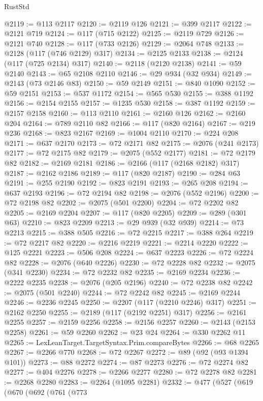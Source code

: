 \begin{lexlean}{RustStd}
\begin{coremodule}
@2119 := @113 @2117
@2120 := @2119 @126
@2121 := @399 @2117
@2122 := @2121 @719
@2124 := @117 (@715 @2122)
@2125 := @2119 @729
@2126 := @2121 @740
@2128 := @117 (@733 @2126)
@2129 := @2064 @748
@2133 := @2128 (@117 (@746 @2129) @317)
@2134 := @2125 @2133
@2138 := @2124 (@117 (@725 @2134) @317)
@2140 := @2118 (@2120 @2138)
@2141 := @59 @2140
@2143 := @65 @2108 @2110
@2146 := @29 @934 (@32 @934)
@2149 := @2143 (@73 @2146 @83)
@2150 := @59 @2149
@2151 := @840 @1090
@2152 := @59 @2151
@2153 := @537 @1172
@2154 := @565 @530
@2155 := @388 @1192
@2156 := @2154 @2155
@2157 := @1235 @530
@2158 := @387 @1192
@2159 := @2157 @2158
@2160 := @113 @2110
@2161 := @2160 @126
@2162 := @2160 @204
@2164 := @789 @2110 @82
@2166 := @117 (@820 @2164)
@2167 := @219 @236
@2168 := @823 @2167
@2169 := @1004 @2110
@2170 := @224 @208
@2171 := @637 @2170
@2173 := @72 @2171 @82
@2175 := @2076 (@241 @2173)
@2177 := @72 @2175 @82
@2179 := @2075 (@552 @2177)
@2181 := @72 @2179 @82
@2182 := @2169 @2181
@2186 := @2166 (@117 (@2168 @2182) @317)
@2187 := @2162 @2186
@2189 := @117 (@820 @2187)
@2190 := @284 @63
@2191 := @255 @2190
@2192 := @823 @2191
@2193 := @265 @208
@2194 := @637 @2193
@2196 := @72 @2194 @82
@2198 := @2076 (@552 @2196)
@2200 := @72 @2198 @82
@2202 := @2075 (@501 @2200)
@2204 := @72 @2202 @82
@2205 := @2169 @2204
@2207 := @117 (@820 @2205)
@2209 := @289 (@301 @63)
@2210 := @823 @2209
@2213 := @29 @939 (@32 @939)
@2214 := @73 @2213
@2215 := @388 @505
@2216 := @72 @2215
@2217 := @388 @264
@2219 := @72 @2217 @82
@2220 := @2216 @2219
@2221 := @2214 @2220
@2222 := @125 @2221
@2223 := @506 @208
@2224 := @637 @2223
@2226 := @72 @2224 @82
@2228 := @2076 (@640 @2226)
@2230 := @72 @2228 @82
@2232 := @2075 (@341 @2230)
@2234 := @72 @2232 @82
@2235 := @2169 @2234
@2236 := @2222 @2235
@2238 := @2076 (@205 @2196)
@2240 := @72 @2238 @82
@2242 := @2075 (@501 @2240)
@2244 := @72 @2242 @82
@2245 := @2169 @2244
@2246 := @2236 @2245
@2250 := @2207 (@117 (@2210 @2246) @317)
@2251 := @2162 @2250
@2255 := @2189 (@117 (@2192 @2251) @317)
@2256 := @2161 @2255
@2257 := @2159 @2256
@2258 := @2156 @2257
@2260 := @2143 (@2153 @2258)
@2261 := @59 @2260
@2262 := @23 @24
@2264 := @330 @2262 @11
@2265 := LexLeanTarget.TargetSyntax.Prim.compareBytes
@2266 := @68 @2265
@2267 := @2266 @770
@2268 := @72 @2267
@2272 := @89 (@92 (@93 @1394 @101))
@2273 := @88 @2272
@2274 := @87 @2273
@2276 := @72 @2274 @82
@2277 := @404 @2276
@2278 := @2266 @2277
@2280 := @72 @2278 @82
@2281 := @2268 @2280
@2283 := @2264 (@1095 @2281)
@2332 := @477
    (@527
      (@619
        (@670
          (@692
            (@761
              (@773

\end{coremodule}
\end{lexlean}
